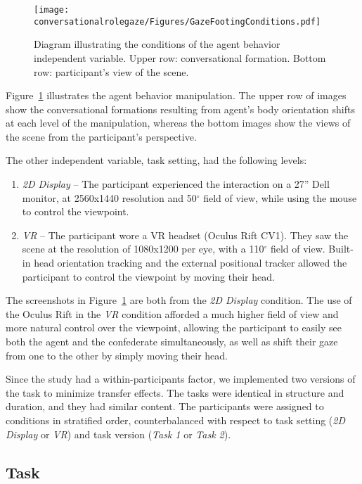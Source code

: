 \begin{figure}
\centering
\texttt{[image: conversationalrolegaze/Figures/GazeFootingConditions.pdf]}
\caption{Diagram illustrating the conditions of the agent behavior independent variable. Upper row: conversational formation. Bottom row: participant's view of the scene.}
\label{fig:GazeFootingConditions}
\end{figure}

Figure~\ref{fig:GazeFootingConditions} illustrates the agent behavior manipulation. The upper row of images show the conversational formations resulting from agent's body orientation shifts at each level of the manipulation, whereas the bottom images show the views of the scene from the participant's perspective.

The other independent variable, task setting, had the following levels:

\begin{enumerate}
\item \emph{2D Display} -- The participant experienced the interaction on a 27'' Dell monitor, at 2560x1440 resolution and 50$^\circ$ field of view, while using the mouse to control the viewpoint.
\item \emph{VR} -- The participant wore a VR headset (Oculus Rift CV1). They saw the scene at the resolution of 1080x1200 per eye, with a 110$^\circ$ field of view. Built-in head orientation tracking and the external positional tracker allowed the participant to control the viewpoint by moving their head.
\end{enumerate}

The screenshots in Figure~\ref{fig:GazeFootingConditions} are both from the \emph{2D Display} condition. The use of the Oculus Rift in the \emph{VR} condition afforded a much higher field of view and more natural control over the viewpoint, allowing the participant to easily see both the agent and the confederate simultaneously, as well as shift their gaze from one to the other by simply moving their head.

Since the study had a within-participants factor, we implemented two versions of the task to minimize transfer effects. The tasks were identical in structure and duration, and they had similar content. The participants were assigned to conditions in stratified order, counterbalanced with respect to task setting (\emph{2D Display} or \emph{VR}) and task version (\emph{Task 1} or \emph{Task 2}).

\subsection{Task}

